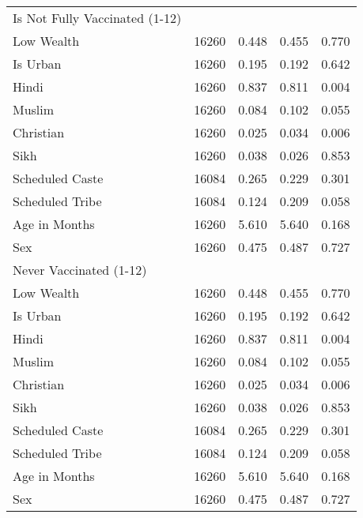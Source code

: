 \begin{tabular}{l*{4}{c}}
\hline
Is Not Fully Vaccinated (1-12)&            &            &            &            \\
Low Wealth  &       16260&       0.448&       0.455&       0.770\\
Is Urban    &       16260&       0.195&       0.192&       0.642\\
Hindi       &       16260&       0.837&       0.811&       0.004\\
Muslim      &       16260&       0.084&       0.102&       0.055\\
Christian   &       16260&       0.025&       0.034&       0.006\\
Sikh        &       16260&       0.038&       0.026&       0.853\\
Scheduled Caste&       16084&       0.265&       0.229&       0.301\\
Scheduled Tribe&       16084&       0.124&       0.209&       0.058\\
Age in Months&       16260&       5.610&       5.640&       0.168\\
Sex         &       16260&       0.475&       0.487&       0.727\\
\hline
Never Vaccinated (1-12)&            &            &            &            \\
Low Wealth  &       16260&       0.448&       0.455&       0.770\\
Is Urban    &       16260&       0.195&       0.192&       0.642\\
Hindi       &       16260&       0.837&       0.811&       0.004\\
Muslim      &       16260&       0.084&       0.102&       0.055\\
Christian   &       16260&       0.025&       0.034&       0.006\\
Sikh        &       16260&       0.038&       0.026&       0.853\\
Scheduled Caste&       16084&       0.265&       0.229&       0.301\\
Scheduled Tribe&       16084&       0.124&       0.209&       0.058\\
Age in Months&       16260&       5.610&       5.640&       0.168\\
Sex         &       16260&       0.475&       0.487&       0.727\\
\hline\hline
\end{tabular}

